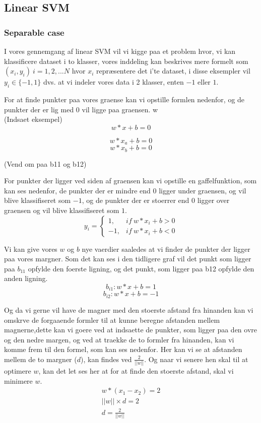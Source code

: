 \documentclass{article}
\begin{document}
\subsection{Linear SVM}
\subsubsection{Separable case}
I vores gennemgang af linear SVM vil vi kigge paa et problem hvor, vi kan klassificere dataset i to klasser, vores inddeling kan beskrives mere formelt som $(x_i,y_i) \ i=1,2,...N$ hvor $x_i$ repræsentere det i'te dataset, i disse eksempler vil $y_i \in \{-1,1\}$ dvs. at vi indeler vores data i 2 klasser, enten $-1$ eller $1$.

For at finde punkter paa vores graense kan vi opstille formlen nedenfor, og de punkter der er lig med $0$ vil ligge paa graensen. w \\
(Indsaet eksempel)
$$w * x + b = 0$$

$$w * x_a + b = 0$$
$$w * x_b + b = 0$$

(Vend om paa b11 og b12)

For punkter der ligger ved siden af graensen kan vi opstille en gaffelfunktion, som kan ses nedenfor, de punkter der er mindre end $0$ ligger under graensen, og vil blive klassifiseret som $-1$, og de punkter der er stoerrer end $0$ ligger over graensen og vil blive klassifiseret som $1$. \\

$$
   y_i = \left\{
     \begin{array}{lr}
       1, & if \ w * x_i + b > 0 \\
       -1, & if \ w * x_i + b < 0
     \end{array}
   \right.
$$

Vi kan give vores $w$ og $b$ nye vaerdier saaledes at vi finder de punkter der ligger paa vores margner. Som det kan ses i den tidligere graf vil det punkt som ligger paa $b_{11}$ opfylde den foerste ligning, og det punkt, som ligger paa b12 opfylde den anden ligning. \\
$$b_{i1}: w * x + b = 1$$
$$b_{i2}: w * x + b = -1$$

Og da vi gerne vil have de magner med den stoerste afstand fra hinanden kan vi omskrve de forgaaende formler til at kunne beregne afstanden mellem magnerne,dette kan vi goere ved at indsaette de punkter, som ligger paa den ovre og den nedre margen, og ved at traekke de to formler fra hinanden, kan vi komme frem til den formel, som kan ses nedenfor. Her kan vi se at afstanden mellem de to margner ($d$), kan findes ved $\frac{2}{||w||}$. Og naar vi senere hen skal til at optimere $w$, kan det let ses her at for at finde den stoerste afstand, skal vi minimere $w$. \\
\begin{align*}
w * (x_1 - x_2) = 2 \\
||w|| \times d = 2 \\
d = \frac{2}{||w||} \\
\end{align*}
\end{document}

